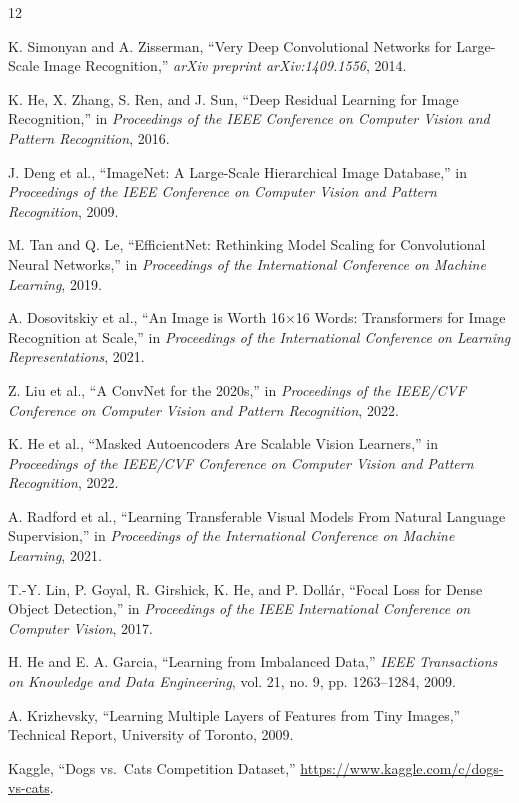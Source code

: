 \documentclass[11pt,a4paper]{article}
\begin{document}
\begin{thebibliography}{12}

K. Simonyan and A. Zisserman,
``Very Deep Convolutional Networks for Large-Scale Image Recognition,''
\textit{arXiv preprint arXiv:1409.1556}, 2014.

K. He, X. Zhang, S. Ren, and J. Sun,
``Deep Residual Learning for Image Recognition,''
in \textit{Proceedings of the IEEE Conference on Computer Vision and Pattern Recognition}, 2016.

J. Deng et al.,
``ImageNet: A Large-Scale Hierarchical Image Database,''
in \textit{Proceedings of the IEEE Conference on Computer Vision and Pattern Recognition}, 2009.

M. Tan and Q. Le,
``EfficientNet: Rethinking Model Scaling for Convolutional Neural Networks,''
in \textit{Proceedings of the International Conference on Machine Learning}, 2019.

A. Dosovitskiy et al.,
``An Image is Worth 16$\times$16 Words: Transformers for Image Recognition at Scale,''
in \textit{Proceedings of the International Conference on Learning Representations}, 2021.

Z. Liu et al.,
``A ConvNet for the 2020s,''
in \textit{Proceedings of the IEEE/CVF Conference on Computer Vision and Pattern Recognition}, 2022.

K. He et al.,
``Masked Autoencoders Are Scalable Vision Learners,''
in \textit{Proceedings of the IEEE/CVF Conference on Computer Vision and Pattern Recognition}, 2022.

A. Radford et al.,
``Learning Transferable Visual Models From Natural Language Supervision,''
in \textit{Proceedings of the International Conference on Machine Learning}, 2021.

T.-Y. Lin, P. Goyal, R. Girshick, K. He, and P. Doll\'ar,
``Focal Loss for Dense Object Detection,''
in \textit{Proceedings of the IEEE International Conference on Computer Vision}, 2017.

H. He and E. A. Garcia,
``Learning from Imbalanced Data,''
\textit{IEEE Transactions on Knowledge and Data Engineering}, vol. 21, no. 9, pp. 1263--1284, 2009.

A. Krizhevsky,
``Learning Multiple Layers of Features from Tiny Images,''
Technical Report, University of Toronto, 2009.

Kaggle,
``Dogs vs.\ Cats Competition Dataset,''
\url{https://www.kaggle.com/c/dogs-vs-cats}.

\end{thebibliography}
\end{document}
